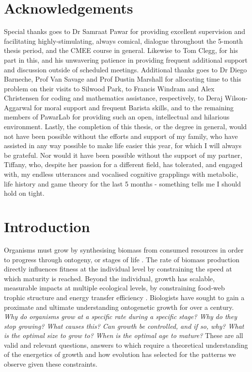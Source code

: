 \documentclass[a4paper]{article} %
\begin{document}
\section*{Acknowledgements}\thispagestyle{plain}
    Special thanks goes to Dr Samraat Pawar for providing excellent supervision and facilitating  highly-stimulating, always comical, dialogue throughout the 5-month thesis period, and the CMEE course in general. Likewise to Tom Clegg, for his part in this, and his unwavering patience in providing frequent additional support and discussion outside of scheduled meetings. Additional thanks goes to Dr Diego Barneche, Prof Van Savage and Prof Dustin Marshall for allocating time to this problem on their visits to Silwood Park, to Francis Windram and Alex Christensen for coding and mathematics assistance, respectively, to Deraj Wilson-Aggarwal for moral support and frequent Barista skills, and to the remaining members of PawarLab for providing such an open, intellectual and hilarious environment. Lastly, the completion of this thesis, or the degree in general, would not have been possible without the efforts and support of my family, who have assisted in any way possible to make life easier this year, for which I will always be grateful. Nor would it have been possible without the support of my partner, Tiffany, who, despite her passion for a different field, has tolerated, and engaged with, my endless utterances and vocalised cognitive grapplings with metabolic, life history and game theory for the last 5 months - something tells me I should hold on tight.

\newpage\tableofcontents\thispagestyle{plain}

\newpage\listoffigures\thispagestyle{plain}


\newpage
\section{Introduction}\thispagestyle{plain}
    Organisms must grow by synthesising biomass from consumed resources in order to progress through ontogeny, or stages of life \autocite{Hariharan2016}. The rate of biomass production directly influences fitness at the individual level by constraining the speed at which maturity is reached. Beyond the individual, growth has scalable, measurable impacts at multiple ecological levels, by constraining food-web trophic structure and energy transfer efficiency \autocite{Barneche2018}. Biologists have sought to gain a proximate and ultimate understanding ontogenetic growth for over a century. \textit{Why do organisms grow at a specific rate during a specific stage? Why do they stop growing? What causes this? Can growth be controlled, and if so, why? What is the optimal size to grow to? When is the optimal age to mature?} These are all valid and relevant questions, answers to which require a theoretical understanding of the energetics of growth and how evolution has selected for the patterns we observe given these constraints. 
    
\end{document}
